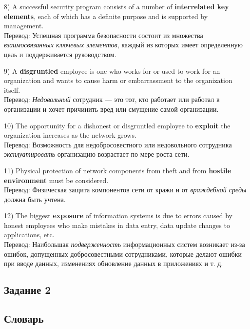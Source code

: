 	\par 8) A successful security program consists of a number of \textbf{interrelated key elements}, each of which has a definite purpose and is supported by management.
	\\
	Перевод: Успешная программа безопасности состоит из множества \textit{взаимосвязанных ключевых элементов}, каждый из которых имеет определенную цель и поддерживается руководством.
	
	\par 9) A \textbf{disgruntled} employee is one who works for or used to work for an organization and wants to cause harm or embarrassment to the organization itself.
	\\
	Перевод: \textit{Недовольный} сотрудник — это тот, кто работает или работал в организации и хочет причинить вред или смущение самой организации.
	
	\par 10) The opportunity for a dishonest or disgruntled employee to \textbf{exploit} the organization increases as the network grows.
	\\
	Перевод: Возможность для недобросовестного или недовольного сотрудника \textit{эксплуатировать} организацию возрастает по мере роста сети.
	
	\par 11) Physical protection of network components from theft and from \textbf{hostile environment} must be considered.
	\\
	Перевод: Физическая защита компонентов сети от кражи и от \textit{враждебной среды} должна быть учтена.
	
	\par 12) The biggest \textbf{exposure} of information systems is due to errors caused by honest employees who make mistakes in data entry, data update changes to applications, etc.
	\\
	Перевод: Наибольшая \textit{подверженность} информационных систем возникает из-за ошибок, допущенных добросовестными сотрудниками, которые делают ошибки при вводе данных, изменениях обновление данных в приложениях и т. д.
	\subsection{Задание 2}
	
	
	
	
	\subsection{Словарь}
	
